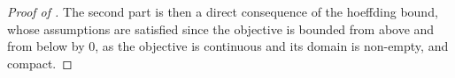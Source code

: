 \begin{proof}[Proof of ]
    
    The second part is then a direct consequence of the hoeffding bound, whose assumptions are satisfied since the objective is bounded from above and from below by 0, as the objective is continuous and its domain is non-empty, and compact.
\end{proof}
